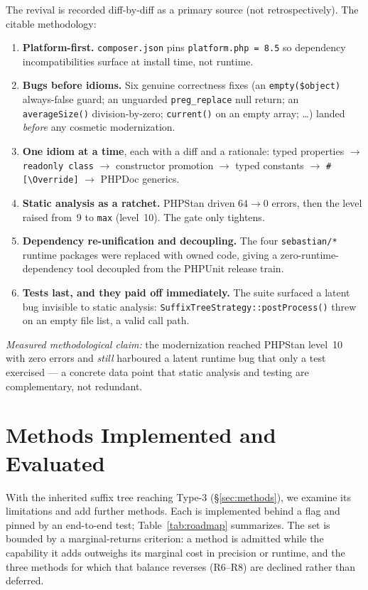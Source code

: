 \documentclass[10pt,a4paper]{article}
\newcounter{prop}[section]
\newcounter{lem}[section]
\begin{document}
The revival is recorded diff-by-diff as a primary source (not retrospectively). The citable
methodology:
\begin{enumerate}[leftmargin=1.4em,itemsep=1pt,topsep=2pt]
  \item \textbf{Platform-first.} \texttt{composer.json} pins \texttt{platform.php = 8.5} so
        dependency incompatibilities surface at install time, not runtime.
  \item \textbf{Bugs before idioms.} Six genuine correctness fixes (an \lstinline!empty($object)!
        always-false guard; an unguarded \lstinline!preg_replace! null return; an
        \lstinline!averageSize()! division-by-zero; \lstinline!current()! on an empty array; \dots)
        landed \emph{before} any cosmetic modernization.
  \item \textbf{One idiom at a time}, each with a diff and a rationale: typed properties
        $\rightarrow$ \texttt{readonly class} $\rightarrow$ constructor promotion $\rightarrow$ typed
        constants $\rightarrow$ \texttt{\#[\textbackslash Override]} $\rightarrow$ PHPDoc generics.
  \item \textbf{Static analysis as a ratchet.} PHPStan driven $64\rightarrow0$ errors, then the
        level raised from~9 to \texttt{max} (level~10). The gate only tightens.
  \item \textbf{Dependency re-unification and decoupling.} The four \texttt{sebastian/*} runtime
        packages were replaced with owned code, giving a zero-runtime-dependency tool decoupled from
        the PHPUnit release train.
  \item \textbf{Tests last, and they paid off immediately.} The suite surfaced a latent bug invisible
        to static analysis: \lstinline!SuffixTreeStrategy::postProcess()! threw on an empty file
        list, a valid call path.
\end{enumerate}

\noindent\emph{Measured methodological claim:} the modernization reached PHPStan level~10 with zero
errors and \emph{still} harboured a latent runtime bug that only a test exercised --- a concrete data
point that static analysis and testing are complementary, not redundant.

\section{Methods Implemented and Evaluated}
\label{sec:engineering}

With the inherited suffix tree reaching Type-3 (\S\ref{sec:methods}), we examine its limitations and
add further methods. Each is implemented behind a flag and pinned by an end-to-end test;
Table~\ref{tab:roadmap} summarizes. The set is bounded by a marginal-returns criterion: a method is
admitted while the capability it adds outweighs its marginal cost in precision or runtime, and the
three methods for which that balance reverses (R6--R8) are declined rather than deferred.
\end{document}
